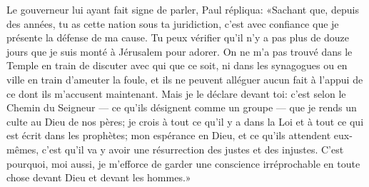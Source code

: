 Le gouverneur lui ayant fait signe de parler, Paul répliqua:
	«Sachant que, depuis des années, tu as cette nation sous ta juridiction,
	c’est avec confiance que je présente la défense de ma cause.
	Tu peux vérifier qu’il n’y a pas plus de douze jours
		que je suis monté à Jérusalem pour adorer.
On ne m’a pas trouvé dans le Temple en train de discuter avec qui que ce soit,
	ni dans les synagogues ou en ville en train d’ameuter la foule,
	et ils ne peuvent alléguer aucun fait
		à l’appui de ce dont ils m’accusent maintenant.
Mais je le déclare devant toi: c’est selon le Chemin du Seigneur
	--- ce qu’ils désignent comme un groupe ---
	que je rends un culte au Dieu de nos pères;
	je crois à tout ce qu’il y a dans la Loi
	et à tout ce qui est écrit dans les prophètes;
	mon espérance en Dieu, et ce qu’ils attendent eux-mêmes,
	c’est qu’il va y avoir une résurrection des justes et des injustes.
C’est pourquoi, moi aussi,
	je m’efforce de garder une conscience irréprochable en toute chose
	devant Dieu et devant les hommes.»
